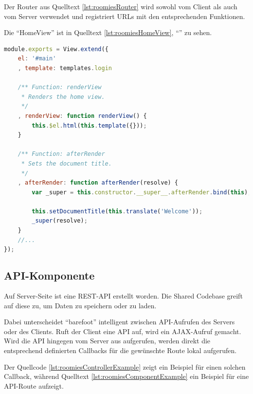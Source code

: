 Der Router aus Quelltext \ref{lst:roomiesRouter} wird sowohl vom Client als auch vom Server verwendet und registriert URLs mit den entsprechenden Funktionen.

Die ``HomeView'' ist in Quelltext \ref{lst:roomiesHomeView}, ``'' zu sehen.

\begin{lstlisting}[language=JavaScript, caption=Ausschnitt aus HomeView der Beispielapplikation \cite{roomiesHomeView}, label=lst:roomiesHomeView, firstnumber=7]
module.exports = View.extend({
	el: '#main'
	, template: templates.login

	/** Function: renderView
	 * Renders the home view.
	 */
	, renderView: function renderView() {
		this.$el.html(this.template({}));
	}

	/** Function: afterRender
	 * Sets the document title.
	 */
	, afterRender: function afterRender(resolve) {
		var _super = this.constructor.__super__.afterRender.bind(this);

		this.setDocumentTitle(this.translate('Welcome'));
		_super(resolve);
	}
	//...
});
\end{lstlisting}

\subsection{API-Komponente}
Auf Server-Seite ist eine REST-API \cite{REST} erstellt worden. Die Shared Codebase greift auf diese zu, um Daten zu speichern oder zu laden.

Dabei unterscheidet ``barefoot'' intelligent zwischen API-Aufrufen des Servers oder des Clients.
Ruft der Client eine API auf, wird ein AJAX-Aufruf gemacht. Wird die API
hingegen vom Server aus aufgerufen, werden direkt die entsprechend definierten
Callbacks für die gewünschte Route lokal aufgerufen.

Der Quellcode \ref{lst:roomiesControllerExample} zeigt ein Beispiel für einen solchen
Callback, während Quelltext \ref{lst:roomiesComponentExample} ein Beispiel für
eine API-Route aufzeigt.

